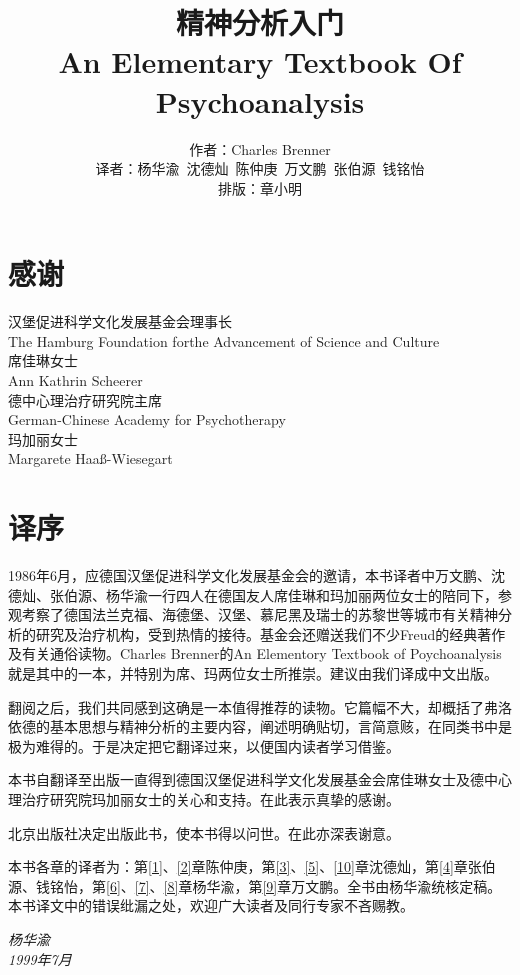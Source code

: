 \documentclass[UTF8,10pt,a4paper,openany]{book}
\title{精神分析入门\\ An Elementary Textbook Of Psychoanalysis}
\author{作者：Charles Brenner\\ 译者：杨华渝~沈德灿~陈仲庚~万文鹏~张伯源~钱铭怡\\ 排版：章小明}
\date{}
\newcommand{\signature}[1]{\begin{flushright}\slshape #1\end{flushright}}
\begin{document}
\frontmatter
\maketitle

\chapter*{感谢}
\begin{center}
汉堡促进科学文化发展基金会理事长\\
The Hamburg Foundation forthe Advancement of Science and Culture\\
席佳琳女士\\
Ann Kathrin Scheerer\\[2ex]
德中心理治疗研究院主席\\
German-Chinese Academy for Psychotherapy\\
玛加丽女士\\
Margarete Haa\ss{}-Wiesegart\\
\end{center}

\chapter*{译序}
1986年6月，应德国汉堡促进科学文化发展基金会的邀请，本书译者中万文鹏、沈德灿、张伯源、杨华渝一行四人在德国友人席佳琳和玛加丽两位女士的陪同下，参观考察了德国法兰克福、海德堡、汉堡、慕尼黑及瑞士的苏黎世等城市有关精神分析的研究及治疗机构，受到热情的接待。基金会还赠送我们不少Freud的经典著作及有关通俗读物。Charles Brenner的An Elementory Textbook of Poychoanalysis就是其中的一本，并特别为席、玛两位女士所推崇。建议由我们译成中文出版。

翻阅之后，我们共同感到这确是一本值得推荐的读物。它篇幅不大，却概括了弗洛依德的基本思想与精神分析的主要内容，阐述明确贴切，言简意赅，在同类书中是极为难得的。于是决定把它翻译过来，以便国内读者学习借鉴。

本书自翻译至出版一直得到德国汉堡促进科学文化发展基金会席佳琳女士及德中心理治疗研究院玛加丽女士的关心和支持。在此表示真挚的感谢。

北京出版社决定出版此书，使本书得以问世。在此亦深表谢意。

本书各章的译者为：第\ref{1}、\ref{2}章陈仲庚，第\ref{3}、\ref{5}、\ref{10}章沈德灿，第\ref{4}章张伯源、钱铭怡，第\ref{6}、\ref{7}、\ref{8}章杨华渝，第\ref{9}章万文鹏。全书由杨华渝统核定稿。本书译文中的错误纰漏之处，欢迎广大读者及同行专家不吝赐教。
\signature{杨华渝\\ 1999年7月}
\end{document}

